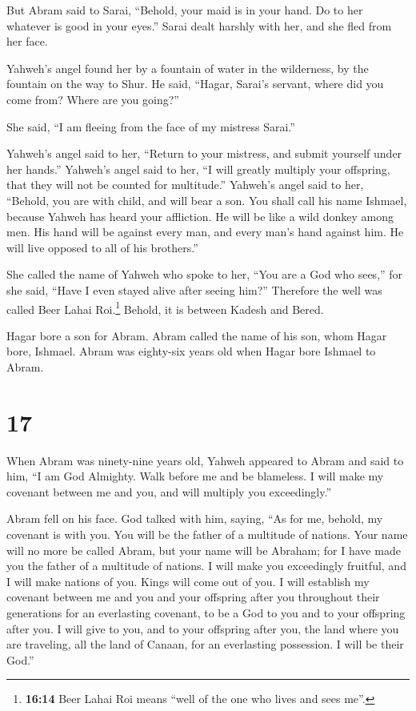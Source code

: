  But Abram said to Sarai, ``Behold, your maid is in your
hand. Do to her whatever is good in your eyes.'' Sarai dealt harshly
with her, and she fled from her face.

 Yahweh's angel found her by a fountain of water in the
wilderness, by the fountain on the way to Shur.  He said,
``Hagar, Sarai's servant, where did you come from? Where are you
going?''

She said, ``I am fleeing from the face of my mistress Sarai.''

 Yahweh's angel said to her, ``Return to your mistress,
and submit yourself under her hands.''  Yahweh's angel
said to her, ``I will greatly multiply your offspring, that they will
not be counted for multitude.''  Yahweh's angel said to
her, ``Behold, you are with child, and will bear a son. You shall call
his name Ishmael, because Yahweh has heard your affliction.
 He will be like a wild donkey among men. His hand will
be against every man, and every man's hand against him. He will live
opposed to all of his brothers.''

 She called the name of Yahweh who spoke to her, ``You
are a God who sees,'' for she said, ``Have I even stayed alive after
seeing him?''  Therefore the well was called Beer Lahai
Roi.\footnote{\textbf{16:14} Beer Lahai Roi means ``well of the one who
  lives and sees me''.} Behold, it is between Kadesh and Bered.

 Hagar bore a son for Abram. Abram called the name of his
son, whom Hagar bore, Ishmael.  Abram was eighty-six
years old when Hagar bore Ishmael to Abram.

\hypertarget{section-16}{%
\section{17}\label{section-16}}

 When Abram was ninety-nine years old, Yahweh appeared to
Abram and said to him, ``I am God Almighty. Walk before me and be
blameless.  I will make my covenant between me and you,
and will multiply you exceedingly.''

 Abram fell on his face. God talked with him, saying,
 ``As for me, behold, my covenant is with you. You will be
the father of a multitude of nations.  Your name will no
more be called Abram, but your name will be Abraham; for I have made you
the father of a multitude of nations.  I will make you
exceedingly fruitful, and I will make nations of you. Kings will come
out of you.  I will establish my covenant between me and
you and your offspring after you throughout their generations for an
everlasting covenant, to be a God to you and to your offspring after
you.  I will give to you, and to your offspring after you,
the land where you are traveling, all the land of Canaan, for an
everlasting possession. I will be their God.''


